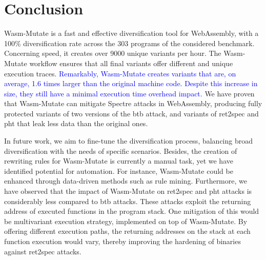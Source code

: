 \documentclass[a4paper,fleqn]{cas-dc}
\newcommand{\tool}{{\sc Wasm-Mutate}\xspace}
\newcommand{\Wasm}{WebAssembly\xspace}
\newcommand{\wasm}{\Wasm}
\newcommand{\revision}[1]{\textcolor{blue}{#1}}
\begin{document}
\section{Conclusion}
\label{conc}

\tool is a fast and effective diversification tool for \wasm, with a 100\% diversification rate across the 303 programs of the considered benchmark. 
Concerning speed, it creates over 9000 unique variants per hour.
The \tool workflow ensures that all final variants offer different and unique execution traces. 
\revision{Remarkably, \tool creates variants that are, on average, 1.6 times larger than the original machine code. 
Despite this increase in size, they still have a minimal execution time overhead impact.}
We have proven that \tool can mitigate Spectre attacks in \wasm, producing fully protected variants of two versions of the btb attack, and variants of ret2spec and pht that leak less data than the original ones.


In future work, we aim to fine-tune the diversification process, balancing broad diversification with the needs of specific scenarios. 
Besides, the creation of rewriting rules for \tool is currently a manual task, yet we have identified potential for automation. 
For instance, \tool could be enhanced through data-driven methods such as rule mining.
Furthermore, we have observed that the impact of \tool on ret2spec and pht attacks is considerably less compared to btb attacks. 
These attacks exploit the returning address of executed functions in the program stack. 
One mitigation of this would be multivariant execution strategy, implemented on top of \tool. By offering different execution paths, the returning addresses on the stack at each function execution would vary, thereby improving the hardening of binaries against ret2spec attacks.








\balance
\end{document}
